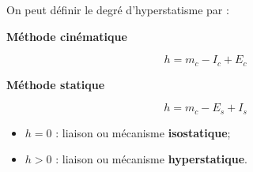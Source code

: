 \documentclass[10pt,fleqn]{article} %
\begin{document}
\begin{definition}
On peut définir le degré d'hyperstatisme par :

\vspace{-.6cm}

\begin{multicols}{2}
\begin{center}
\textbf{Méthode cinématique}
\end{center}

\vspace{-.5cm}

$$
h=m_c-I_c+E_c
$$

\begin{center}
\textbf{Méthode statique} 
\end{center}

\vspace{-.5cm}

$$
h=m_c-E_s+I_s
$$

\end{multicols}
		\begin{itemize}
			\item $h=0$ : liaison ou mécanisme \textbf{isostatique};
			\item $h>0$ : liaison ou mécanisme \textbf{hyperstatique}.
		\end{itemize}
\end{definition}
\end{document}
